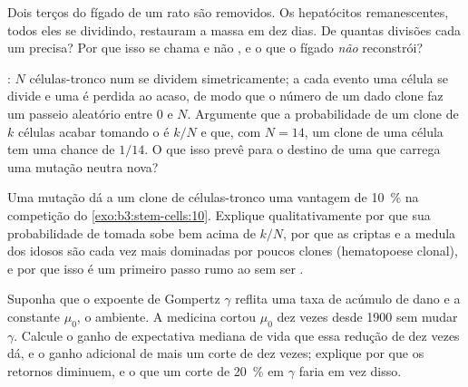 \begin{exercise}[$\star\star$]\label{exo:b3:stem-cells:9}
Dois terços do fígado de um rato são removidos. Os hepatócitos
remanescentes, todos eles se dividindo, restauram a massa em dez dias.
De quantas divisões cada um precisa? Por que isso se chama  e não , e o que o fígado \emph{não} reconstrói?
\end{exercise}

\begin{exercise}[$\star\star\star$]\label{exo:b3:stem-cells:10}
: $N$ células-tronco num  se dividem simetricamente; a
cada evento uma célula se divide e uma é perdida ao acaso, de modo que o
número de um dado clone faz um passeio aleatório entre $0$ e $N$.
Argumente que a probabilidade de um clone de $k$ células acabar tomando o
 é $k/N$ e que, com $N = 14$, um clone de uma célula tem uma chance
de $1/14$. O que isso prevê para o destino de uma  que
carrega uma mutação neutra nova?
\end{exercise}

\begin{exercise}[$\star\star\star$]\label{exo:b3:stem-cells:11}
Uma mutação dá a um clone de células-tronco uma vantagem de \qty{10}{\%}
na competição do \cref{exo:b3:stem-cells:10}. Explique qualitativamente
por que sua probabilidade de tomada sobe bem acima de $k/N$, por que as
criptas e a medula dos idosos são cada vez mais dominadas por poucos
clones (hematopoese clonal), e por que isso é um primeiro passo rumo ao
 sem ser .
\end{exercise}

\begin{exercise}[$\star\star\star$]\label{exo:b3:stem-cells:12}
Suponha que o expoente de Gompertz $\gamma$ reflita uma taxa de acúmulo
de dano e a constante $\mu_{0}$, o ambiente. A medicina cortou $\mu_{0}$
dez vezes desde 1900 sem mudar $\gamma$. Calcule o ganho de expectativa
mediana de vida que essa redução de dez vezes dá, e o ganho adicional de
mais um corte de dez vezes; explique por que os retornos diminuem, e o
que um corte de \qty{20}{\%} em $\gamma$ faria em vez disso.
\end{exercise}

